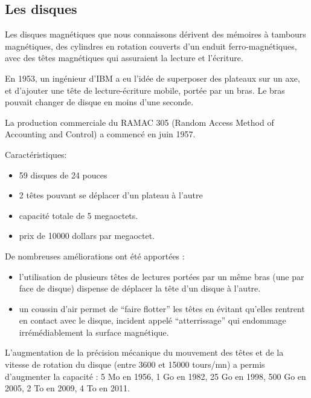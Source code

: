 \begin{multicols}{2}
\section{Les disques}

Les disques magnétiques que nous connaissons dérivent des mémoires à
tambours magnétiques, des cylindres en rotation couverts d'un enduit
ferro-magnétiques, avec des têtes magnétiques qui
assuraient la lecture et l'écriture.


En 1953, un ingénieur d'IBM a eu l'idée de superposer des plateaux sur
un axe, et d'ajouter une tête de lecture-écriture mobile, portée par
un bras. Le bras pouvait changer de disque en moins d'une seconde.


La production commerciale du RAMAC 305 (Random Access Method of
Accounting and Control) a commencé en juin 1957.


Caractéristiques: 
\begin{itemize}
\item 59 disques de 24 pouces
\item 2 têtes pouvant se déplacer d'un plateau à l'autre
\item capacité totale de 5 megaoctets.
\item prix de 10000 dollars par megaoctet.
\end{itemize}


De nombreuses améliorations ont été apportées : 
\begin{itemize}
\item l'utilisation de
plusieurs têtes de lectures portées par un même bras (une par face de
disque) dispense de déplacer la tête d'un disque à l'autre. 
\item un coussin d'air permet de ``faire flotter'' les têtes en
  évitant qu'elles rentrent en contact avec le disque, incident appelé
  ``atterrissage'' qui endommage irrémédiablement la surface magnétique.
\end{itemize}
L'augmentation de la précision mécanique du mouvement des têtes et de
la vitesse de rotation du disque (entre 3600 et 15000 tours/mn) a
permis d'augmenter la capacité : 5 Mo en 1956, 1 Go en 1982, 25 Go en
1998, 500 Go en 2005, 2 To en 2009, 4 To en 2011.





\end{multicols}
